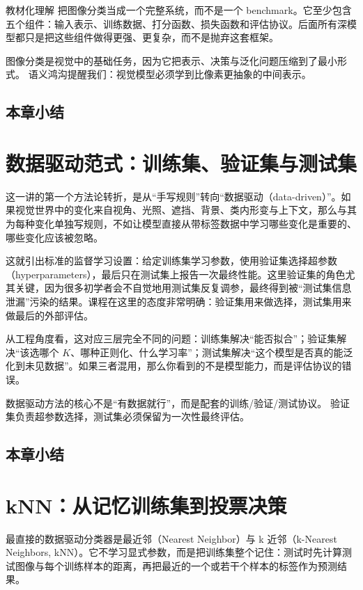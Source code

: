 \documentclass[a4paper]{article}
\begin{document}
\begin{importantbox}{教材化理解}
把图像分类当成一个完整系统，而不是一个 benchmark。它至少包含五个组件：输入表示、训练数据、打分函数、损失函数和评估协议。后面所有深模型都只是把这些组件做得更强、更复杂，而不是抛弃这套框架。
\end{importantbox}

图像分类是视觉中的基础任务，因为它把表示、决策与泛化问题压缩到了最小形式。
语义鸿沟提醒我们：视觉模型必须学到比像素更抽象的中间表示。
\subsection{本章小结}

\section{数据驱动范式：训练集、验证集与测试集}
这一讲的第一个方法论转折，是从“手写规则”转向“数据驱动（data-driven）”。如果视觉世界中的变化来自视角、光照、遮挡、背景、类内形变与上下文，那么与其为每种变化单独写规则，不如让模型直接从带标签数据中学习哪些变化是重要的、哪些变化应该被忽略。

这就引出标准的监督学习设置：给定训练集学习参数，使用验证集选择超参数（hyperparameters），最后只在测试集上报告一次最终性能。这里验证集的角色尤其关键，因为很多初学者会不自觉地用测试集反复调参，最终得到被“测试集信息泄漏”污染的结果。课程在这里的态度非常明确：验证集用来做选择，测试集用来做最后的外部评估。

从工程角度看，这对应三层完全不同的问题：训练集解决“能否拟合”；验证集解决“该选哪个 $K$、哪种正则化、什么学习率”；测试集解决“这个模型是否真的能泛化到未见数据”。如果三者混用，那么你看到的不是模型能力，而是评估协议的错误。

数据驱动方法的核心不是“有数据就行”，而是配套的训练/验证/测试协议。
验证集负责超参数选择，测试集必须保留为一次性最终评估。
\subsection{本章小结}

\section{kNN：从记忆训练集到投票决策}
最直接的数据驱动分类器是最近邻（Nearest Neighbor）与 k 近邻（k-Nearest Neighbors, kNN）。它不学习显式参数，而是把训练集整个记住：测试时先计算测试图像与每个训练样本的距离，再把最近的一个或若干个样本的标签作为预测结果。
\end{document}
